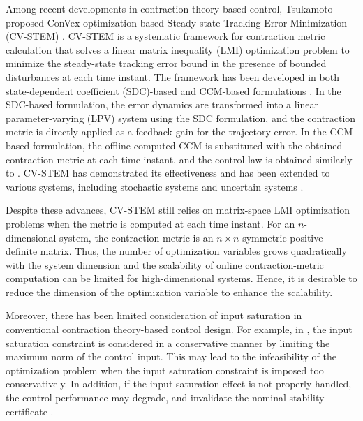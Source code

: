 \documentclass{ifacconf}
\begin{document}
Among recent developments in contraction theory-based control, Tsukamoto {\etal} proposed ConVex optimization-based Steady-state Tracking Error Minimization (CV-STEM) \citep{Tsukamoto:2019aa}.
CV-STEM is a systematic framework for contraction metric calculation that solves a linear matrix inequality (LMI) optimization problem to minimize the steady-state tracking error bound in the presence of bounded disturbances at each time instant.
The framework has been developed in both state-dependent coefficient (SDC)-based and CCM-based formulations \citep{Tsukamoto:2021aa}.
In the SDC-based formulation, the error dynamics are transformed into a linear parameter-varying (LPV) system using the SDC formulation, and the contraction metric is directly applied as a feedback gain for the trajectory error.
In the CCM-based formulation, the offline-computed CCM is substituted with the obtained contraction metric at each time instant, and the control law is obtained similarly to \citep{Manchester:2017aa}.
CV-STEM has demonstrated its effectiveness and has been extended to various systems, including stochastic systems \citep{Tsukamoto:2021ad} and uncertain systems \citep{Tsukamoto:2021af}.

Despite these advances, CV-STEM still relies on matrix-space LMI optimization problems when the metric is computed at each time instant.
For an $n$-dimensional system, the contraction metric is an $n\times n$ symmetric positive definite matrix.
Thus, the number of optimization variables grows quadratically with the system dimension and the scalability of online contraction-metric computation can be limited for high-dimensional systems.
Hence, it is desirable to reduce the dimension of the optimization variable to enhance the scalability.

Moreover, there has been limited consideration of input saturation in conventional contraction theory-based control design.
For example, in \citep{Tsukamoto:2019aa}, the input saturation constraint is considered in a conservative manner by limiting the maximum norm of the control input.
This may lead to the infeasibility of the optimization problem when the input saturation constraint is imposed too conservatively.
In addition, if the input saturation effect is not properly handled, the control performance may degrade, and invalidate the nominal stability certificate \citep{Ryu:2025aa}.
\end{document}
